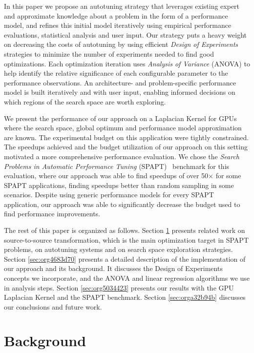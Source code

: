 \documentclass[conference]{IEEEtran}
\begin{document}
In this paper we propose an autotuning strategy that leverages existing expert
and approximate knowledge about a problem in the form of a performance model,
and refines this initial model iteratively using empirical performance
evaluations, statistical analysis and user input. Our strategy puts a heavy
weight on decreasing the costs of autotuning by using efficient \emph{Design of
Experiments} strategies to minimize the number of experiments needed to find good
optimizations. Each optimization iteration uses \emph{Analysis of Variance} (ANOVA)
to help identify the relative significance of each configurable parameter to the
performance observations. An architecture- and problem-specific performance
model is built iteratively and with user input, enabling informed decisions on
which regions of the search space are worth exploring.

We present the performance of our approach on a Laplacian Kernel for GPUs where
the search space, global optimum and performance model approximation are known.
The experimental budget on this application were tightly constrained. The
speedups achieved and the budget utilization of our approach on this setting
motivated a more comprehensive performance evaluation. We chose the \emph{Search
Problems in Automatic Performance Tuning}
(SPAPT)~\cite{balaprakash2012spapt} benchmark for this evaluation, where
our approach was able to find speedups of over 50\(\times\) for some SPAPT
applications, finding speedups better than random sampling in some scenarios.
Despite using generic performance models for every SPAPT application, our
approach was able to significantly decrease the budget used to find performance
improvements.

The rest of this paper is organized as follows. Section \ref{sec:org76d2813} presents
related work on source-to-source transformation, which is the main optimization
target in SPAPT problems, on autotuning systems and on search space exploration
strategies. Section \ref{sec:org4683d70} presents a
detailed description of the implementation of our approach and its background.
It discusses the Design of Experiments concepts we incorporate, and the ANOVA
and linear regression algorithms we use in analysis steps. Section \ref{sec:org5034423} presents our results with the GPU Laplacian Kernel and the SPAPT
benchmark. Section \ref{sec:orga32b94b} discusses our conclusions and future work.
\section{Background}
\label{sec:org76d2813}
\end{document}
